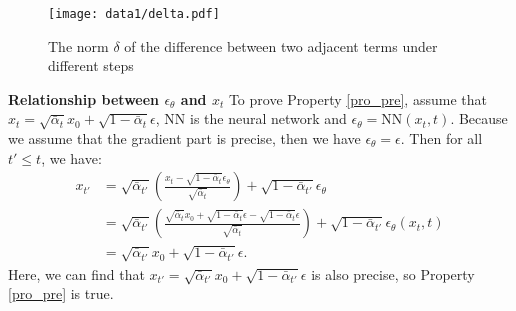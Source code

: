 \documentclass{article}
\begin{document}
\begin{figure}[!htbp]
   \centering
   \texttt{[image: data1/delta.pdf]}
   \caption{The norm $\delta$ of the difference between two adjacent terms under different steps}
   \label{fi_delta}
\end{figure}

\textbf{Relationship between $\epsilon_\theta$ and $x_t$} To prove Property \ref{pro_pre}, assume that $x_t= \sqrt{\bar{\alpha}_t}x_0 + \sqrt{1-\bar{\alpha}_t}\epsilon$, NN is the neural network and $\epsilon_\theta=\text{NN}(x_t, t)$. Because we assume that the gradient part is precise, then we have $\epsilon_\theta = \epsilon$. Then for all $t'\leq t$, we have:
\begin{equation}
   \begin{split}
      x_{t'} &= \sqrt{\bar{\alpha}_{t'}}\left(\frac{x_t-\sqrt{1-\bar{\alpha}_t}\epsilon_\theta}{\sqrt{\bar{\alpha}_t}}\right) + \sqrt{1-\bar{\alpha}_{t'}}\epsilon_\theta \\
             &= \sqrt{\bar{\alpha}_{t'}}\left(\frac{\sqrt{\bar{\alpha}_t}x_0 + \sqrt{1-\bar{\alpha}_t}\epsilon-\sqrt{1-\bar{\alpha}_t}\epsilon}{\sqrt{\bar{\alpha}_t}}\right) + \sqrt{1-\bar{\alpha}_{t'}}\epsilon_\theta(x_t, t) \\
             &= \sqrt{\bar{\alpha}_{t'}}x_0 + \sqrt{1-\bar{\alpha}_{t'}}\epsilon.
   \end{split}
\end{equation}
Here, we can find that $x_{t'}=\sqrt{\bar{\alpha}_{t'}}x_0 + \sqrt{1-\bar{\alpha}_{t'}}\epsilon$ is also precise, so Property \ref{pro_pre} is true.
\end{document}

